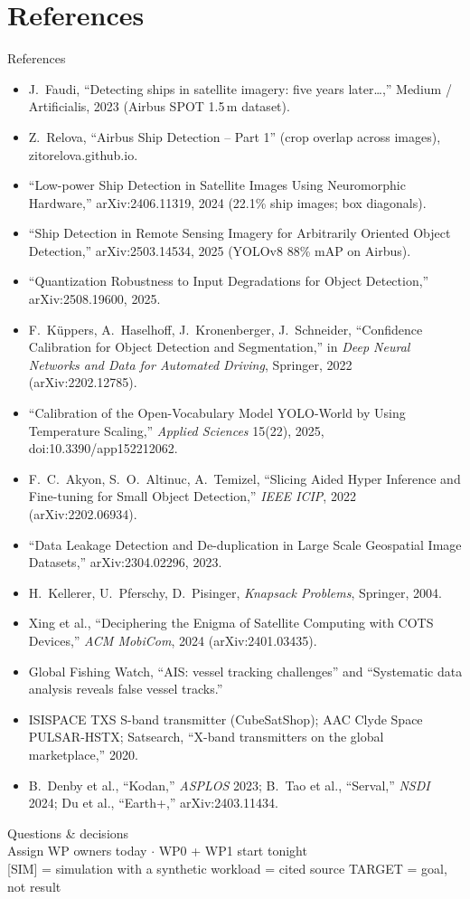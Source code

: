 \documentclass[aspectratio=169,10pt]{beamer}
\begin{document}
\section*{References}
\begin{frame}[allowframebreaks]{References}
\scriptsize
\begin{itemize}
  \item J.~Faudi, ``Detecting ships in satellite imagery: five years later\ldots,'' Medium / Artificialis, 2023 (Airbus SPOT 1.5\,m dataset).
  \item Z.~Relova, ``Airbus Ship Detection -- Part 1'' (crop overlap across images), zitorelova.github.io.
  \item ``Low-power Ship Detection in Satellite Images Using Neuromorphic Hardware,'' arXiv:2406.11319, 2024 (22.1\% ship images; box diagonals).
  \item ``Ship Detection in Remote Sensing Imagery for Arbitrarily Oriented Object Detection,'' arXiv:2503.14534, 2025 (YOLOv8 88\% mAP on Airbus).
  \item ``Quantization Robustness to Input Degradations for Object Detection,'' arXiv:2508.19600, 2025.
  \item F.~K\"uppers, A.~Haselhoff, J.~Kronenberger, J.~Schneider, ``Confidence Calibration for Object Detection and Segmentation,'' in \emph{Deep Neural Networks and Data for Automated Driving}, Springer, 2022 (arXiv:2202.12785).
  \item ``Calibration of the Open-Vocabulary Model YOLO-World by Using Temperature Scaling,'' \emph{Applied Sciences} 15(22), 2025, doi:10.3390/app152212062.
  \item F.~C.~Akyon, S.~O.~Altinuc, A.~Temizel, ``Slicing Aided Hyper Inference and Fine-tuning for Small Object Detection,'' \emph{IEEE ICIP}, 2022 (arXiv:2202.06934).
  \item ``Data Leakage Detection and De-duplication in Large Scale Geospatial Image Datasets,'' arXiv:2304.02296, 2023.
  \item H.~Kellerer, U.~Pferschy, D.~Pisinger, \emph{Knapsack Problems}, Springer, 2004.
  \item Xing et al., ``Deciphering the Enigma of Satellite Computing with COTS Devices,'' \emph{ACM MobiCom}, 2024 (arXiv:2401.03435).
  \item Global Fishing Watch, ``AIS: vessel tracking challenges'' and ``Systematic data analysis reveals false vessel tracks.''
  \item ISISPACE TXS S-band transmitter (CubeSatShop); AAC Clyde Space PULSAR-HSTX; Satsearch, ``X-band transmitters on the global marketplace,'' 2020.
  \item B.~Denby et al., ``Kodan,'' \emph{ASPLOS} 2023; B.~Tao et al., ``Serval,'' \emph{NSDI} 2024; Du et al., ``Earth+,'' arXiv:2403.11434.
\end{itemize}
\end{frame}

\begin{frame}
\centering
\vspace{1cm}
{\Huge\color{space} Questions \& decisions}\\[8mm]
{\large Assign WP owners today $\cdot$ WP0 + WP1 start tonight}\\[4mm]
{\small\color{muted} [SIM] = simulation with a synthetic workload \quad [LIT] = cited source \quad TARGET = goal, not result}
\end{frame}
\end{document}
